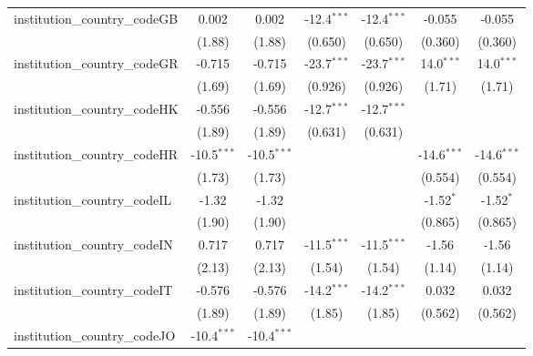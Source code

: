 \begin{tabular}{lcccccc}
   institution\_country\_codeGB          & 0.002         & 0.002         & -12.4$^{***}$ & -12.4$^{***}$ & -0.055        & -0.055\\   
                                         & (1.88)        & (1.88)        & (0.650)       & (0.650)       & (0.360)       & (0.360)\\   
   institution\_country\_codeGR          & -0.715        & -0.715        & -23.7$^{***}$ & -23.7$^{***}$ & 14.0$^{***}$  & 14.0$^{***}$\\   
                                         & (1.69)        & (1.69)        & (0.926)       & (0.926)       & (1.71)        & (1.71)\\   
   institution\_country\_codeHK          & -0.556        & -0.556        & -12.7$^{***}$ & -12.7$^{***}$ &               &   \\   
                                         & (1.89)        & (1.89)        & (0.631)       & (0.631)       &               &   \\   
   institution\_country\_codeHR          & -10.5$^{***}$ & -10.5$^{***}$ &               &               & -14.6$^{***}$ & -14.6$^{***}$\\   
                                         & (1.73)        & (1.73)        &               &               & (0.554)       & (0.554)\\   
   institution\_country\_codeIL          & -1.32         & -1.32         &               &               & -1.52$^{*}$   & -1.52$^{*}$\\   
                                         & (1.90)        & (1.90)        &               &               & (0.865)       & (0.865)\\   
   institution\_country\_codeIN          & 0.717         & 0.717         & -11.5$^{***}$ & -11.5$^{***}$ & -1.56         & -1.56\\   
                                         & (2.13)        & (2.13)        & (1.54)        & (1.54)        & (1.14)        & (1.14)\\   
   institution\_country\_codeIT          & -0.576        & -0.576        & -14.2$^{***}$ & -14.2$^{***}$ & 0.032         & 0.032\\   
                                         & (1.89)        & (1.89)        & (1.85)        & (1.85)        & (0.562)       & (0.562)\\   
   institution\_country\_codeJO          & -10.4$^{***}$ & -10.4$^{***}$ &               &               &               &   \\   

\end{tabular}
